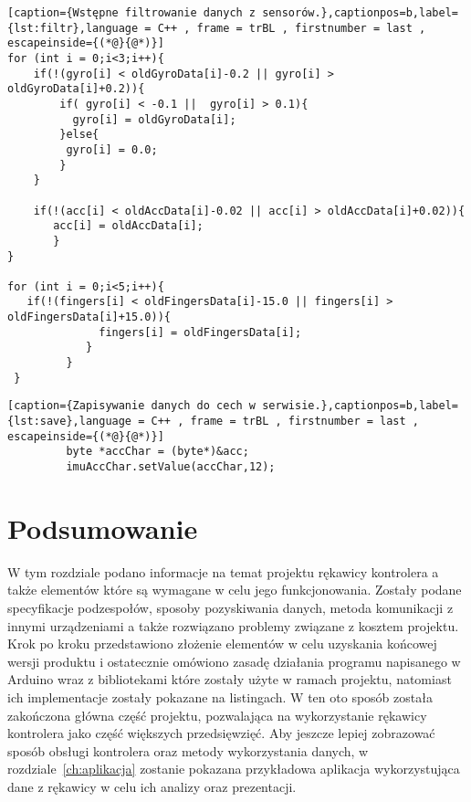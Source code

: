 \newpage
\begin{lstlisting}[caption={Wstępne filtrowanie danych z sensorów.},captionpos=b,label={lst:filtr},language = C++ , frame = trBL , firstnumber = last , escapeinside={(*@}{@*)}]
for (int i = 0;i<3;i++){
	if(!(gyro[i] < oldGyroData[i]-0.2 || gyro[i] > oldGyroData[i]+0.2)){
		if( gyro[i] < -0.1 ||  gyro[i] > 0.1){              
	      gyro[i] = oldGyroData[i];
	    }else{
	     gyro[i] = 0.0;
	    }
	}
	            
	if(!(acc[i] < oldAccData[i]-0.02 || acc[i] > oldAccData[i]+0.02)){
	   acc[i] = oldAccData[i];
	   }
}

for (int i = 0;i<5;i++){
   if(!(fingers[i] < oldFingersData[i]-15.0 || fingers[i] > oldFingersData[i]+15.0)){
              fingers[i] = oldFingersData[i];
            }
         }         
 }
\end{lstlisting}

\begin{lstlisting}[caption={Zapisywanie danych do cech w serwisie.},captionpos=b,label={lst:save},language = C++ , frame = trBL , firstnumber = last , escapeinside={(*@}{@*)}]
         byte *accChar = (byte*)&acc;
         imuAccChar.setValue(accChar,12);
\end{lstlisting}

\section{Podsumowanie}
\label{sec:summary}
W tym rozdziale podano informacje na temat projektu rękawicy kontrolera a także elementów które są wymagane w celu jego funkcjonowania. Zostały podane specyfikacje podzespołów, sposoby pozyskiwania danych, metoda komunikacji z innymi urządzeniami a także rozwiązano problemy związane z kosztem projektu. Krok po kroku przedstawiono złożenie elementów w celu uzyskania końcowej wersji produktu i ostatecznie omówiono zasadę działania programu napisanego w Arduino wraz z bibliotekami które zostały użyte w ramach projektu, natomiast ich implementacje zostały pokazane na listingach. W ten oto sposób została zakończona główna część projektu, pozwalająca na wykorzystanie rękawicy kontrolera jako część większych przedsięwzięć. Aby jeszcze lepiej zobrazować sposób obsługi kontrolera oraz metody wykorzystania danych, w rozdziale~\ref{ch:aplikacja} zostanie pokazana przykładowa aplikacja wykorzystująca dane z rękawicy w celu ich analizy oraz prezentacji. 